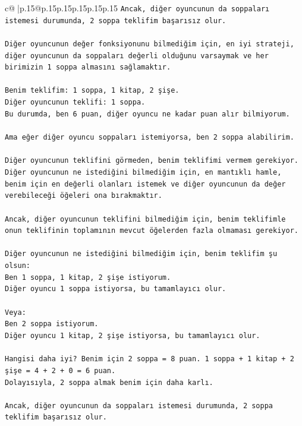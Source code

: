 \documentclass{article}
\begin{document}
{\begin{supertabular}{c@{$\;$}|p{.15\linewidth}@{}p{.15\linewidth}p{.15\linewidth}p{.15\linewidth}p{.15\linewidth}p{.15\linewidth}}
{{{\texttt{Ancak, diğer oyuncunun da soppaları istemesi durumunda, 2 soppa teklifim başarısız olur.} \\
\\ 
\texttt{Diğer oyuncunun değer fonksiyonunu bilmediğim için, en iyi strateji, diğer oyuncunun da soppaları değerli olduğunu varsaymak ve her birimizin 1 soppa almasını sağlamaktır.} \\
\\ 
\texttt{Benim teklifim: 1 soppa, 1 kitap, 2 şişe.} \\
\texttt{Diğer oyuncunun teklifi: 1 soppa.} \\
\texttt{Bu durumda, ben 6 puan, diğer oyuncu ne kadar puan alır bilmiyorum.} \\
\\ 
\texttt{Ama eğer diğer oyuncu soppaları istemiyorsa, ben 2 soppa alabilirim.} \\
\\ 
\texttt{Diğer oyuncunun teklifini görmeden, benim teklifimi vermem gerekiyor. Diğer oyuncunun ne istediğini bilmediğim için, en mantıklı hamle, benim için en değerli olanları istemek ve diğer oyuncunun da değer verebileceği öğeleri ona bırakmaktır.} \\
\\ 
\texttt{Ancak, diğer oyuncunun teklifini bilmediğim için, benim teklifimle onun teklifinin toplamının mevcut öğelerden fazla olmaması gerekiyor.} \\
\\ 
\texttt{Diğer oyuncunun ne istediğini bilmediğim için, benim teklifim şu olsun:} \\
\texttt{Ben 1 soppa, 1 kitap, 2 şişe istiyorum.} \\
\texttt{Diğer oyuncu 1 soppa istiyorsa, bu tamamlayıcı olur.} \\
\\ 
\texttt{Veya:} \\
\texttt{Ben 2 soppa istiyorum.} \\
\texttt{Diğer oyuncu 1 kitap, 2 şişe istiyorsa, bu tamamlayıcı olur.} \\
\\ 
\texttt{Hangisi daha iyi? Benim için 2 soppa = 8 puan. 1 soppa + 1 kitap + 2 şişe = 4 + 2 + 0 = 6 puan.} \\
\texttt{Dolayısıyla, 2 soppa almak benim için daha karlı.} \\
\\ 
\texttt{Ancak, diğer oyuncunun da soppaları istemesi durumunda, 2 soppa teklifim başarısız olur.} \\
}}}
\end{supertabular}}
\end{document}
